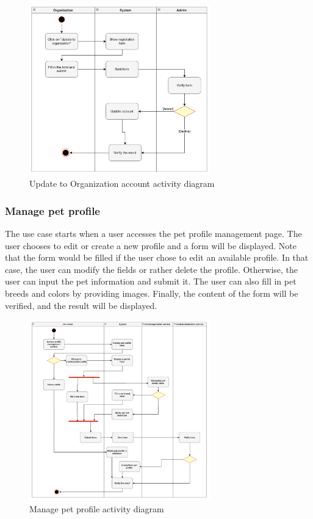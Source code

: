 \begin{figure}[H]
  \centering
  \includegraphics[width=0.7\textwidth]{Figures/update_org.png}
  \caption{Update to Organization account activity diagram}
  \label{fig:update-org}
\end{figure}

\subsubsection{Manage pet profile}

The use case starts when a user accesses the pet profile management page. The user chooses to edit or create a new profile and a form will be displayed. Note that the form would be filled if the user chose to edit an available profile. In that case, the user can modify the fields or rather delete the profile. Otherwise, the user can input the pet information and submit it. The user can also fill in pet breeds and colors by providing images. Finally, the content of the form will be verified, and the result will be displayed.

\begin{figure}[H]
  \centering
  \includegraphics[width=0.7\textwidth]{Figures/manage_pet.png}
  \caption{Manage pet profile activity diagram}
  \label{fig:manage-pet}
\end{figure}

